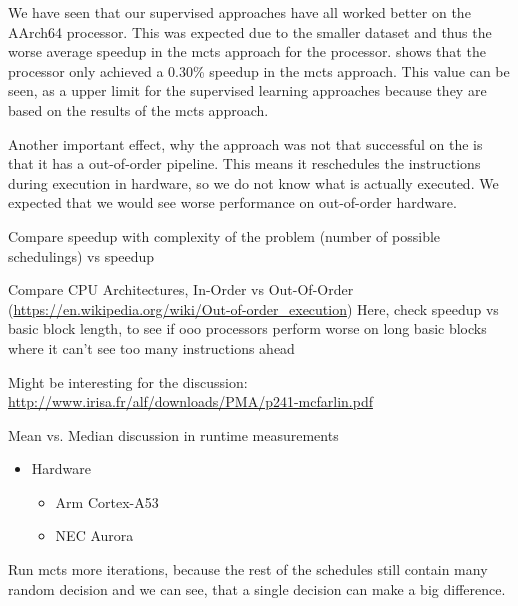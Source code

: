 We have seen that our supervised approaches have all worked better on the AArch64 processor.
This was expected due to the smaller dataset and thus the worse average speedup in the \ac{mcts} approach for the \aurora processor.
 shows that the \aurora processor only achieved a 0.30\% speedup in the \ac{mcts} approach.
This value can be seen, as a upper limit for the supervised learning approaches because they are based on the results of the \ac{mcts} approach.

Another important effect, why the approach was not that successful on the \aurora is that it has a out-of-order pipeline.
This means it reschedules the instructions during execution in hardware, so we do not know what is actually executed.
We expected that we would see worse performance on out-of-order hardware.  

Compare speedup with complexity of the problem (number of possible schedulings) vs speedup

Compare CPU Architectures, In-Order vs Out-Of-Order (\url{https://en.wikipedia.org/wiki/Out-of-order_execution})
Here, check speedup vs basic block length, to see if ooo processors perform worse on long basic blocks where it can't see too many instructions ahead

Might be interesting for the discussion: \url{http://www.irisa.fr/alf/downloads/PMA/p241-mcfarlin.pdf}

Mean vs. Median discussion in runtime measurements

\begin{itemize}
    \item Hardware
    \begin{itemize}
        \item Arm Cortex-A53
        \item NEC Aurora
    \end{itemize}
\end{itemize}



Run \ac{mcts} more iterations, because the rest of the schedules still contain many random decision and we can see, that a single decision can make a big difference.
